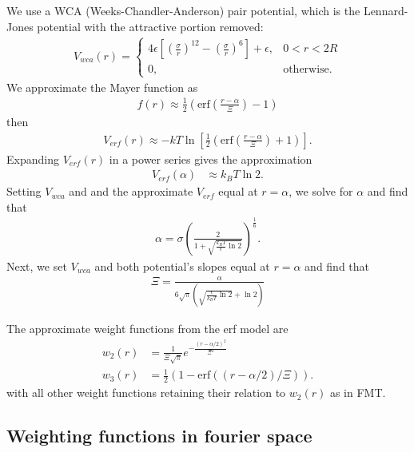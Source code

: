 \documentclass[letterpaper,twocolumn,amsmath,amssymb,prb]{revtex4-1}
\begin{document}
We use a WCA (Weeks-Chandler-Anderson) pair
potential\cite{weeks1971}, which is the Lennard-Jones potential
with the attractive portion removed:
\begin{align}
  V_{wca}(r) =
  \begin{cases}
    4\epsilon \left[ \left(\frac{\sigma}{r}\right)^{12} -
    \left(\frac{\sigma}{r}\right)^{6} \right] + \epsilon, & 0 < r < 2R \\
    0, & \textrm{otherwise}.
  \end{cases}
\end{align}
We approximate the Mayer function as
\begin{align}
  f(r) \approx \tfrac12 \left( \mathrm{erf}\left( \frac{r - \alpha}{\Xi} \right) - 1 \right)
\end{align}
then
\begin{align}
  V_{erf}(r) \approx -kT\ln\left[\tfrac12 \left( \mathrm{erf}\left( \frac{r -
    \alpha}{\Xi} \right) + 1 \right) \right].
\end{align}
Expanding $V_{erf}(r)$ in a power series gives the approximation
\begin{align}
  V_{erf}(\alpha) &\approx k_BT \ln 2.
\end{align}
Setting $V_{wca}$ and and the approximate $V_{erf}$ equal at $r=\alpha$, we solve
for $\alpha$ and find that
\begin{align}
  \alpha = \sigma \left( \frac{2}{1 + \sqrt{\frac{k_BT}{\epsilon}
        \ln 2}} \right)^{\frac{1}{6}}.
\end{align}
Next, we set $V_{wca}$ and both potential's slopes equal at $r = \alpha$ and find that
\begin{align}
  \Xi = \frac{\alpha}{6\sqrt{\pi} \left( \sqrt{\frac{\epsilon}{k_BT} \ln
      2} + \ln 2 \right)}
\end{align}

The approximate weight functions from the erf model are
\begin{align}
  w_2(r) &= \frac{1}{\Xi \sqrt{\pi}} e^{-\frac{(r-\alpha/2)^2}{\Xi^2}} \\
  w_3(r) &= \tfrac12 ( 1 - \mathrm{erf}((r-\alpha/2)/\Xi) ).
\end{align}
with all other weight functions retaining their relation to $w_2(r)$
as in FMT.

\subsection{Weighting functions in fourier space}
\end{document}

